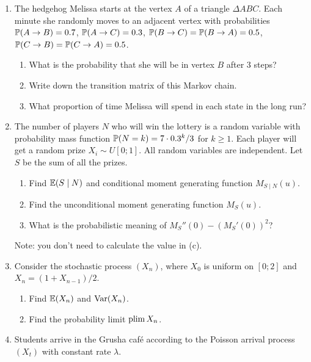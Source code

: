 \begin{enumerate} %
  \item The hedgehog Melissa starts at the vertex $A$ of a triangle $\Delta ABC$.
  Each minute she randomly moves to an adjacent vertex with probabilities $\P(A \to B) = 0.7$, 
  $\P(A \to C) = 0.3$, $\P(B \to C) = \P(B \to A) = 0.5$,  $\P(C \to B) = \P(C \to A) = 0.5$.

  \begin{enumerate}
    \item What is the probability that she will be in vertex $B$ after 3 steps?
    \item Write down the transition matrix of this Markov chain. 
    \item What proportion of time Melissa will spend in each state in the long run?
  \end{enumerate}
  
  \item The number of players $N$ who will win the lottery
  is a random variable with probability mass function $\P(N = k) = 7\cdot 0.3^k / 3$ for $k\geq 1$.
  Each player will get a random prize $X_i \sim U[0;1]$.
  All random variables are independent. 
  Let $S$ be the sum of all the prizes. 

  \begin{enumerate}
    \item Find $\E(S \mid N)$ and conditional moment generating function $M_{S\mid N}(u)$.
    \item Find the unconditional moment generating function $M_S(u)$.
    \item What is the probabilistic meaning of $M_S''(0) - (M_S'(0))^2$? 
  \end{enumerate}

  Note: you don't need to calculate the value in (c). 
  
  \item Consider the stochastic process $(X_n)$, where $X_0$ is uniform on $[0;2]$ and
  $X_n = (1 + X_{n-1}) / 2$.

  \begin{enumerate}
    \item Find $\E(X_n)$ and $\Var(X_n)$.
    \item Find the probability limit $\plim X_n$.
  \end{enumerate}
  
  \item Students arrive in the Grusha café according to the Poisson arrival process $(X_t)$ 
  with constant rate $\lambda$. 


\end{enumerate}
